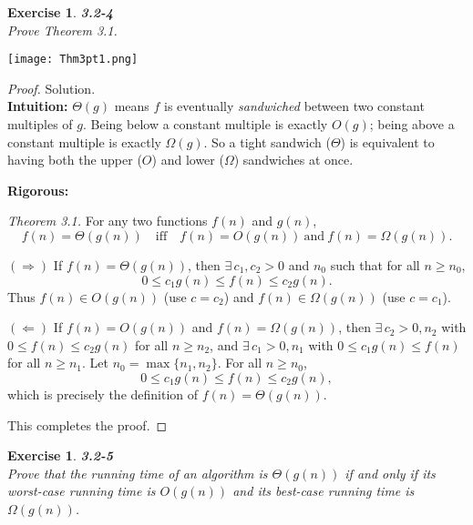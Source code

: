 \documentclass[12pt]{article}
\newtheorem{exercise}[theorem]{Exercise}
\theoremstyle{definition}
\begin{document}
\newpage

\begin{exercise}
\noindent
\textbf{3.2-4} \\
Prove Theorem 3.1.
\end{exercise}

\begin{center}
    \texttt{[image: Thm3pt1.png]}
\end{center}

\begin{proof}
Solution. \\

\noindent
\textbf{Intuition:}  
$\Theta(g)$ means $f$ is eventually \emph{sandwiched} between two constant multiples of $g$.
Being below a constant multiple is exactly $O(g)$; being above a constant multiple is exactly
$\Omega(g)$. So a tight sandwich ($\Theta$) is equivalent to having both the upper ($O$) and
lower ($\Omega$) sandwiches at once.

\noindent
\textbf{Rigorous:}  

\emph{Theorem 3.1.} For any two functions $f(n)$ and $g(n)$,
\[
f(n)=\Theta(g(n)) \quad \text{iff} \quad f(n)=O(g(n)) \ \text{and} \ f(n)=\Omega(g(n)).
\]

$(\Rightarrow)$ If $f(n)=\Theta(g(n))$, then $\exists\,c_1,c_2>0$ and $n_0$ such that for all $n\ge n_0$,
\[
0 \le c_1 g(n) \le f(n) \le c_2 g(n).
\]
Thus $f(n)\in O(g(n))$ (use $c=c_2$) and $f(n)\in \Omega(g(n))$ (use $c=c_1$).

$(\Leftarrow)$ If $f(n)=O(g(n))$ and $f(n)=\Omega(g(n))$, then $\exists\,c_2>0,n_2$ with
$0\le f(n)\le c_2 g(n)$ for all $n\ge n_2$, and $\exists\,c_1>0,n_1$ with
$0\le c_1 g(n)\le f(n)$ for all $n\ge n_1$. Let $n_0=\max\{n_1,n_2\}$. For all $n\ge n_0$,
\[
0 \le c_1 g(n) \le f(n) \le c_2 g(n),
\]
which is precisely the definition of $f(n)=\Theta(g(n))$.

This completes the proof.
\end{proof}

\newpage

\begin{exercise}
\noindent
\textbf{3.2-5} \\
Prove that the running time of an algorithm is $\Theta(g(n))$ if and only if its
worst-case running time is $O(g(n))$ and its best-case running time is $\Omega(g(n))$.
\end{exercise}
\end{document}
